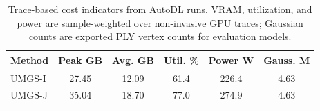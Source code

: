\begin{table}[!t]
    \caption{Trace-based cost indicators from AutoDL runs. VRAM, utilization, and power are sample-weighted over non-invasive GPU traces; Gaussian counts are exported PLY vertex counts for evaluation models.}
    \label{tab:cost}
    \centering
    \scriptsize
    \setlength{\tabcolsep}{2.4pt}
    \begin{tabular}{lccccc}
        \toprule
        Method & Peak GB & Avg. GB & Util. \% & Power W & Gauss. M \\
        \midrule
        UMGS-I & 27.45 & 12.09 & 61.4 & 226.4 & 4.63 \\
        UMGS-J & 35.04 & 18.70 & 77.0 & 274.9 & 4.63 \\
        \bottomrule
    \end{tabular}
\end{table}
